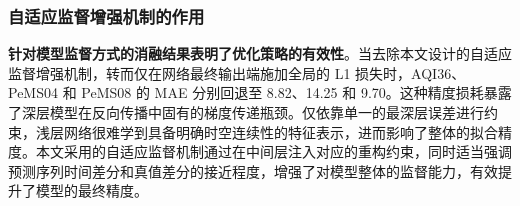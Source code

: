 \subsubsection{自适应监督增强机制的作用}

\textbf{针对模型监督方式的消融结果表明了优化策略的有效性}。当去除本文设计的自适应监督增强机制，转而仅在网络最终输出端施加全局的 L1 损失时，AQI36、PeMS04 和 PeMS08 的 MAE 分别回退至 8.82、14.25 和 9.70。这种精度损耗暴露了深层模型在反向传播中固有的梯度传递瓶颈。仅依靠单一的最深层误差进行约束，浅层网络很难学到具备明确时空连续性的特征表示，进而影响了整体的拟合精度。本文采用的自适应监督机制通过在中间层注入对应的重构约束，同时适当强调预测序列时间差分和真值差分的接近程度，增强了对模型整体的监督能力，有效提升了模型的最终精度。   
    
    \begin{table}[htbp]
        \centering
        \caption{\label{tab:hierarchical_imputer_hyperparameters}输入与自适应监督增强驱动的层次化时空插补网络的核心超参数设置}
\end{table}
